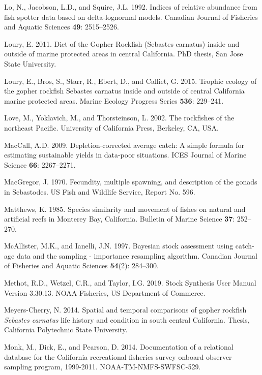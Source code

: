 \documentclass[12pt,]{article}
\begin{document}
\hypertarget{ref-Lo1992}{}
Lo, N., Jacobson, L.D., and Squire, J.L. 1992. Indices of relative
abundance from fish spotter data based on delta-lognormal models.
Canadian Journal of Fisheries and Aquatic Sciences \textbf{49}:
2515--2526.

\hypertarget{ref-Loury2011}{}
Loury, E. 2011. Diet of the Gopher Rockfish (Sebastes carnatus) inside
and outside of marine protected areas in central California. PhD thesis,
San Jose State University.

\hypertarget{ref-Loury2015}{}
Loury, E., Bros, S., Starr, R., Ebert, D., and Calliet, G. 2015. Trophic
ecology of the gopher rockfish Sebastes carnatus inside and outside of
central California marine protected areas. Marine Ecology Progress
Series \textbf{536}: 229--241.

\hypertarget{ref-Love2002}{}
Love, M., Yoklavich, M., and Thorsteinson, L. 2002. The rockfishes of
the northeast Pacific. University of California Press, Berkeley, CA,
USA.

\hypertarget{ref-MacCall2009}{}
MacCall, A.D. 2009. Depletion-corrected average catch: A simple formula
for estimating sustainable yields in data-poor situations. ICES Journal
of Marine Science \textbf{66}: 2267--2271.

\hypertarget{ref-MacGregor1970}{}
MacGregor, J. 1970. Fecundity, multiple spawning, and description of the
gonads in Sebastodes. US Fish and Wildlife Service, Report No. 596.

\hypertarget{ref-Matthews1985}{}
Matthews, K. 1985. Species similarity and movement of fishes on natural
and artificial reefs in Monterey Bay, California. Bulletin of Marine
Science \textbf{37}: 252--270.

\hypertarget{ref-McAllister1997}{}
McAllister, M.K., and Ianelli, J.N. 1997. Bayesian stock assessment
using catch-age data and the sampling - importance resampling algorithm.
Canadian Journal of Fisheries and Aquatic Sciences \textbf{54}(2):
284--300.

\hypertarget{ref-Methot2019}{}
Methot, R.D., Wetzel, C.R., and Taylor, I.G. 2019. Stock Synthesis User
Manual Version 3.30.13. NOAA Fisheries, US Department of Commerce.

\hypertarget{ref-MeyersCherry2014}{}
Meyers-Cherry, N. 2014. Spatial and temporal comparisons of gopher
rockfish \emph{Sebastes carnatus} life history and condition in south
central California. Thesis, California Polytechnic State University.

\hypertarget{ref-Monk2014}{}
Monk, M., Dick, E., and Pearson, D. 2014. Documentation of a relational
database for the California recreational fisheries survey onboard
observer sampling program, 1999-2011. NOAA-TM-NMFS-SWFSC-529.
\end{document}
